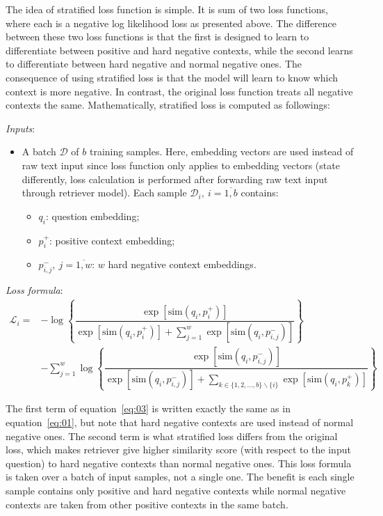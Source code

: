 \documentclass[12pt, sort&compress]{report}
\begin{document}
\par The idea of stratified loss function is simple. It is sum of two loss functions, where each is a negative log likelihood loss as presented above. The difference between these two loss functions is that the first is designed to learn to differentiate between positive and hard negative contexts, while the second learns to differentiate between hard negative and normal negative ones. The consequence of using stratified loss is that the model will learn to know which context is more negative. In contrast, the original loss function treats all negative contexts the same. Mathematically, stratified loss is computed as followings:
\par\textit{Inputs}:
\begin{itemize}
	\item A batch $\mathcal{D}$ of $b$ training samples. Here, embedding vectors are used instead of raw text input since loss function only applies to embedding vectors (state differently, loss calculation is performed after forwarding raw text input through retriever model). Each sample $\mathcal{D}_i, \:i = \overline{1, b}$ contains:
	\begin{itemize}
		\item $q_i$: question embedding;
		\item $p_i^+$: positive context embedding;
		\item $p_{i,j}^-,\: j=\overline{1, w}$: $w$ hard negative context embeddings.
	\end{itemize} 
\end{itemize}
\par\textit{Loss formula}:
\begin{equation}
	\begin{array}{ll}
		\label{eq:03}
		\mathcal{L}_i = &-\log\left\{\dfrac{\exp\left[{\text{sim}\left(q_i, p_i^+\right)}\right]}{\exp\left[{\text{sim}\left(q_i, p_i^+\right)}\right] + \sum\limits_{j=1}^w\exp\left[\text{sim}\left(q_i, p_{i,j}^-\right)\right]}\right\} \\[40pt]
		&-\sum\limits_{j=1}^w\log\left\{\dfrac{\exp\left[\text{sim}\left(q_i, p_{i,j}^-\right)\right]}{\exp\left[\text{sim}\left(q_i, p_{i,j}^-\right)\right] + \sum\limits_{k\in \{1, 2,..., b\}\backslash\{i\}} \exp\left[\text{sim}\left(q_i, p_k^+\right)\right]}\right\}
	\end{array}
\end{equation}
\par The first term of equation~\eqref{eq:03} is written exactly the same as in equation~\eqref{eq:01}, but note that hard negative contexts are used instead of normal negative ones. The second term is what stratified loss differs from the original loss, which makes retriever give higher similarity score (with respect to the input question) to hard negative contexts than normal negative ones. This loss formula is taken over a batch of input samples, not a single one. The benefit is each single sample contains only positive and hard negative contexts while normal negative contexts are taken from other positive contexts in the same batch. 
\end{document}
